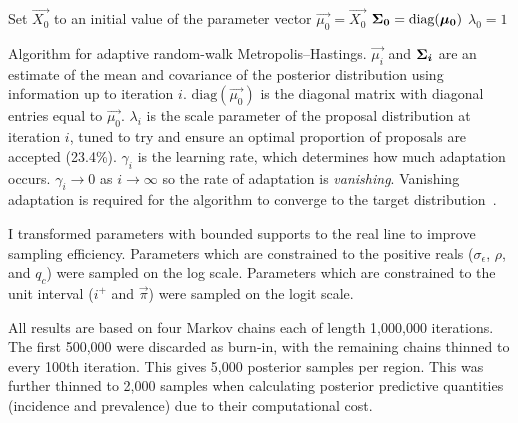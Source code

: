 \documentclass[thesis.tex]{subfiles}
\begin{document}
\begin{algorithm}
 Set $\vec{X_0}$ to an initial value of the parameter vector \;
 $\vec{\mu_0} = \vec{X_0}$ \;
 $\bm{\Sigma_0} = \text{diag}(\bm{\mu_0})$ \;
 $\lambda_0 = 1$ \;
 \caption{Algorithm for adaptive random-walk Metropolis--Hastings. $\vec{\mu_i}$ and $\bm{\Sigma_i}$ are an estimate of the mean and covariance of the posterior distribution using information up to iteration $i$. $\text{diag}(\vec{\mu_0})$ is the diagonal matrix with diagonal entries equal to $\vec{\mu_0}$. $\lambda_i$ is the scale parameter of the proposal distribution at iteration $i$, tuned to try and ensure an optimal proportion of proposals are accepted (23.4\%). $\gamma_i$ is the learning rate, which determines how much adaptation occurs. $\gamma_i \to 0$ as $i \to \infty$ so the rate of adaptation is \emph{vanishing}. Vanishing adaptation is required for the algorithm to converge to the target distribution~\autocite[section 3]{andrieuTutorial}.}
 \label{SEIR:MCMC-algorithm}
\end{algorithm}

I transformed parameters with bounded supports to the real line to improve sampling efficiency.
Parameters which are constrained to the positive reals ($\sigma_\epsilon$, $\rho$, and $q_c$) were sampled on the log scale.
Parameters which are constrained to the unit interval ($i^+$ and $\vec{\pi}$) were sampled on the logit scale.

All results are based on four Markov chains each of length 1,000,000 iterations.
The first 500,000 were discarded as burn-in, with the remaining chains thinned to every 100th iteration.
This gives 5,000 posterior samples per region.
This was further thinned to 2,000 samples when calculating posterior predictive quantities (incidence and prevalence) due to their computational cost.
\end{document}
